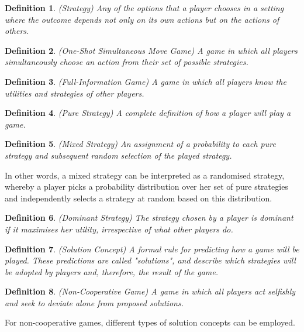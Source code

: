 \documentclass{article}
\newtheorem{definition}{Definition}
\begin{document}
\begin{definition}
(Strategy) Any of the options that a player chooses in a setting where the outcome depends not only on its own actions but on the actions of others.
\end{definition}

\begin{definition}
(One-Shot Simultaneous Move Game) A game in which all players simultaneously choose an action from their set of possible strategies.
\end{definition}

\begin{definition}
(Full-Information Game) A game in which all players know the utilities and strategies of other players.
\end{definition}

\begin{definition}
(Pure Strategy) A complete definition of how a player will play a game.
\end{definition}

\begin{definition}
(Mixed Strategy) An assignment of a probability to each pure strategy and subsequent random selection of the played strategy.
\end{definition}

In other words, a mixed strategy can be interpreted as a randomised strategy, whereby a player picks a probability distribution over her set of pure strategies and independently selects a strategy at random based on this distribution.

\begin{definition}
(Dominant Strategy) The strategy chosen by a player is dominant if it maximises her utility, irrespective of what other players do.
\end{definition}

\begin{definition}
(Solution Concept) A formal rule for predicting how a game will be played. These predictions are called "solutions", and describe which strategies will be adopted by players and, therefore, the result of the game.
\end{definition}

\begin{definition}
(Non-Cooperative Game) A game in which all players act selfishly and seek to deviate alone from proposed solutions.
\end{definition}

For non-cooperative games, different types of solution concepts can be employed.
\end{document}
